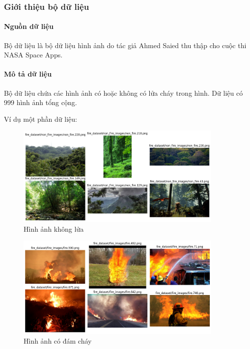 \subsubsection{Giới thiệu bộ dữ liệu}
    \paragraph{Nguồn dữ liệu}
    \leavevmode

    Bộ dữ liệu là bộ dữ liệu hình ảnh do tác giả Ahmed Saied thu thập cho cuộc thi NASA Space Apps.

    \paragraph{Mô tả dữ liệu}
    \leavevmode

    Bộ dữ liệu chứa các hình ảnh có hoặc không có lửa cháy trong hình. Dữ liệu có 999 hình ảnh tổng cộng.

    Ví dụ một phần dữ liệu:

    \begin{figure}[htp]
        \centering
        \includegraphics[width=0.90\textwidth]{images/Img_fire_label0_exp.png}
        \caption{Hình ảnh không lửa}
        \label{fig:Img_fire_label0_exp}
    \end{figure}
    \FloatBarrier

    \begin{figure}[htp]
        \centering
        \includegraphics[width=0.90\textwidth]{images/Img_fire_label1_exp.png}
        \caption{Hình ảnh có đám cháy}
        \label{fig:Img_lung_label0_exp}
    \end{figure}
    \FloatBarrier

